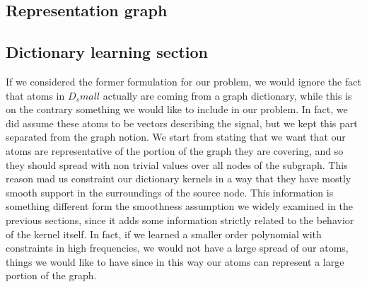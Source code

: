 \subsection{Representation graph}

\subsection{Dictionary learning section}
If we considered the former formulation for our problem, we would ignore the fact that atoms in $D_small$ actually are coming from a graph dictionary, while this is on the contrary something we would like to include in our problem. In fact, we did assume these atoms to be vectors describing the signal, but we kept this part separated from the graph notion. We start from stating that we want that our atoms are representative of the portion of the graph they are covering, and so they should spread with non trivial values over all nodes of the subgraph. This reason mad us constraint our dictionary kernels in a way that they have mostly smooth support in the surroundings of the source node. This information is something different form the smoothness assumption we widely examined in the previous sections, since it adds some information strictly related to the behavior of the kernel itself. In fact, if we learned a smaller order polynomial with constraints in high frequencies, we would not have a large spread of our atoms, things we would like to have since in this way our atoms can represent a large portion of the graph. 

